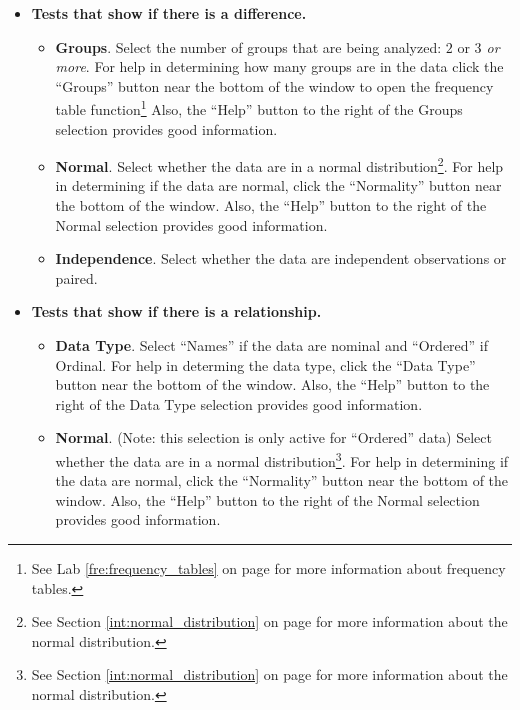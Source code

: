 \begin{itemize}
  \item \textbf{Tests that show if there is a difference.}
  
  \begin{itemize}

    \item \textbf{Groups}. Select the number of groups that are being analyzed: \textit{$ 2 $} or \textit{$ 3 $ or more}. For help in determining how many groups are in the data click the ``Groups'' button near the bottom of the window to open the frequency table function\footnote{See Lab \ref{fre:frequency_tables} on page \pageref{fre:frequency_tables} for more information about frequency tables.} Also, the ``Help'' button to the right of the Groups selection provides good information.

    \item \textbf{Normal}. Select whether the data are in a normal distribution\footnote{See Section \ref{int:normal_distribution} on page \pageref{int:normal_distribution} for more information about the normal distribution.}. For help in determining if the data are normal, click the ``Normality'' button near the bottom of the window. Also, the ``Help'' button to the right of the Normal selection provides good information.

    \item \textbf{Independence}. Select whether the data are independent observations or paired. 

  \end{itemize}

  \item \textbf{Tests that show if there is a relationship.}
  
  \begin{itemize}
  
    \item \textbf{Data Type}. Select ``Names'' if the data are nominal and ``Ordered'' if Ordinal. For help in determing the data type, click the ``Data Type'' button near the bottom of the window. Also, the ``Help'' button to the right of the Data Type selection provides good information.
    
    \item \textbf{Normal}. (Note: this selection is only active for ``Ordered'' data) Select whether the data are in a normal distribution\footnote{See Section \ref{int:normal_distribution} on page \pageref{int:normal_distribution} for more information about the normal distribution.}. For help in determining if the data are normal, click the ``Normality'' button near the bottom of the window. Also, the ``Help'' button to the right of the Normal selection provides good information.
    
  \end{itemize}  
    
\end{itemize}

